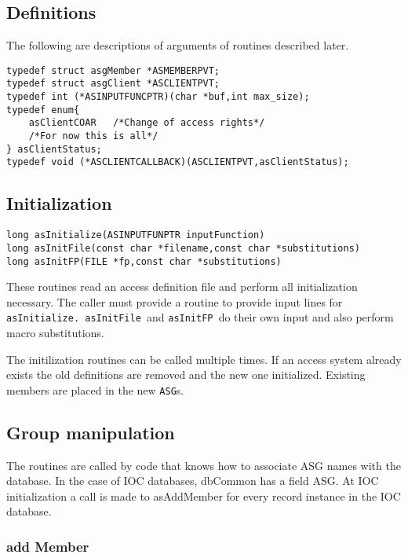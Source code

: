 \subsection{Definitions}

The following are descriptions of arguments of routines described later.

\begin{verbatim}typedef struct asgMember *ASMEMBERPVT;
typedef struct asgClient *ASCLIENTPVT;
typedef int (*ASINPUTFUNCPTR)(char *buf,int max_size);
typedef enum{
    asClientCOAR   /*Change of access rights*/
    /*For now this is all*/
} asClientStatus;
typedef void (*ASCLIENTCALLBACK)(ASCLIENTPVT,asClientStatus);

\end{verbatim}\subsection{Initialization}

\begin{verbatim}long asInitialize(ASINPUTFUNPTR inputFunction)
long asInitFile(const char *filename,const char *substitutions)
long asInitFP(FILE *fp,const char *substitutions)
\end{verbatim}
These routines read an access definition file and perform all initialization necessary. The caller must provide a routine to 
provide input lines for \verb|asInitialize. asInitFile |and \verb|asInitFP |do their own input and also perform macro 
substitutions.

The initilization routines can be called multiple times. If an access system already exists the old definitions are removed 
and the new one initialized. Existing members are placed in the new \verb|ASG|s. 

\subsection{Group manipulation}

The routines are called by code that knows how to associate ASG names with the database. In the case of IOC databases, 
dbCommon has a field ASG. At IOC initialization a call is made to asAddMember for every record instance in the IOC 
database.

\subsubsection{add Member}

